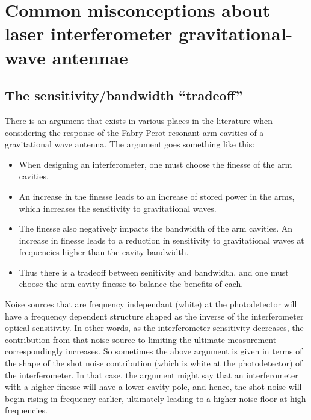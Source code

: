 \chapter{Common misconceptions about laser interferometer gravitational-wave antennae}

\section{The sensitivity/bandwidth ``tradeoff''}
There is an argument that exists in various places in the literature when considering the response of the Fabry-Perot resonant arm cavities of a gravitational wave antenna. %
The argument goes something like this:
\begin{itemize}
\item When designing an interferometer, one must choose the finesse of the arm cavities.
\item An increase in the finesse leads to an increase of stored power in the arms, which increases the sensitivity to gravitational waves.
\item The finesse also negatively impacts the bandwidth of the arm cavities. An increase in finesse leads to a reduction in sensitivity to gravitational waves at frequencies higher than the cavity bandwidth.
\item Thus there is a tradeoff between senitivity and bandwidth, and one must choose the arm cavity finesse to balance the benefits of each.
\end{itemize}

Noise sources that are frequency independant (white) at the photodetector will have a frequency dependent structure shaped as the inverse of the interferometer optical sensitivity. %
In other words, as the interferometer sensitivity decreases, the contribution from that noise source to limiting the ultimate measurement correspondingly increases. %
So sometimes the above argument is given in terms of the shape of the shot noise contribution (which is white at the photodetector) of the interferometer. %
In that case, the argument might say that an interferometer with a higher finesse will have a lower cavity pole, and hence, the shot noise will begin rising in frequency earlier, ultimately leading to a higher noise floor at high frequencies.

